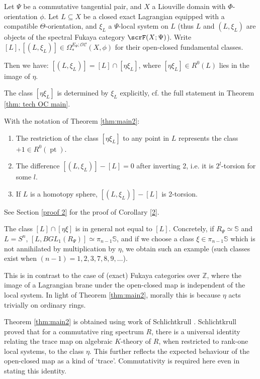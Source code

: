 \documentclass{TPmod}
\newcommand{\pt}{\operatorname{pt}}
\def\bS{\mathbb{S}}
\def\bZ{\mathbb{Z}}
\newcommand{\cC}{\mathcal{C}}
\newcommand{\cO}{\mathcal{O}}
\def\bZ{\mathbb{Z}}
\renewcommand{\cong}{\simeq}
\numberwithin{equation}{section}
\begin{document}
\begin{thm} \label{thm:main2}
    Let $\Psi$ be a commutative tangential pair, and $X$ a Liouville domain with $\Phi$-orientation $\phi$. Let $L \subseteq X$ be a closed exact Lagrangian equipped with a compatible $\Theta$-orientation, and $\xi_L$ a $\Psi$-local system on $L$ (thus $L$ and $(L, \xi_L)$ are objects of the spectral Fukaya category $\scrF(X; \Psi)$). Write $[L], [(L, \xi_L)] \in \Omega_*^{E_\Psi;\cO\cC}(X,\phi)$ for their open-closed fundamental classes.


    Then we have: $[(L, \xi_L)] = [L] \cap [\eta\xi_L]$, where $[\eta\xi_L] \in R^0(L)$ lies in the image of $\eta$.
\end{thm}
The class $[\eta\xi_L]$ is determined by $\xi_L$ explicitly, cf. the full statement in Theorem \ref{thm: tech OC main}.
\begin{cor}\label{2}
With the notation of Theorem \ref{thm:main2}: 
    \begin{enumerate}
        \item The restriction of the class $[\eta\xi_L]$ to any point in $L$ represents the class $+1 \in R^0(\pt)$.

        \item The difference $[(L, \xi_L)]-[L]=0$ after inverting 2, i.e. it is $2^l$-torsion for some $l$. 
        \item If $L$ is a homotopy sphere, $[(L, \xi_L)]-[L]$ is 2-torsion.
    \end{enumerate}
\end{cor}
See Section \ref{proof 2} for the proof of Corollary \ref{2}.

\begin{rmk}\label{rmk: eoirkhgourhg}
    The class $[L] \cap [\eta\xi]$ is in general not equal to $[L]$. Concretely, if $R_\Psi \cong \bS$ and $L=S^n$, $[L, BGL_1(R_\Psi)] \cong \pi_{n-1}\bS$, and if we choose a class $\xi \in \pi_{n-1}\bS$ which is not annihilated by multiplication by $\eta$, we obtain such an example (such classes exist when $(n-1) = 1,2,3,7,8,9,\dots$).
    
    
    This is in contrast to the case of (exact) Fukaya categories over $\bZ$, where the image of a Lagrangian brane under the open-closed map is independent of the local system. In light of Theorem \ref{thm:main2}, morally this is because $\eta$ acts trivially on ordinary rings.
\end{rmk}


Theorem \ref{thm:main2} is obtained using work of Schlichtkrull \cite{Schlichtkrull}. Schlichtkrull proved that for a commutative ring spectrum $R$, there is a universal identity relating the trace map on algebraic $K$-theory of $R$, when restricted to rank-one local systems, to the class $\eta$. This further reflects the expected behaviour of the open-closed map as a kind of `trace'. Commutativity is required here even in stating this identity.
\end{document}

